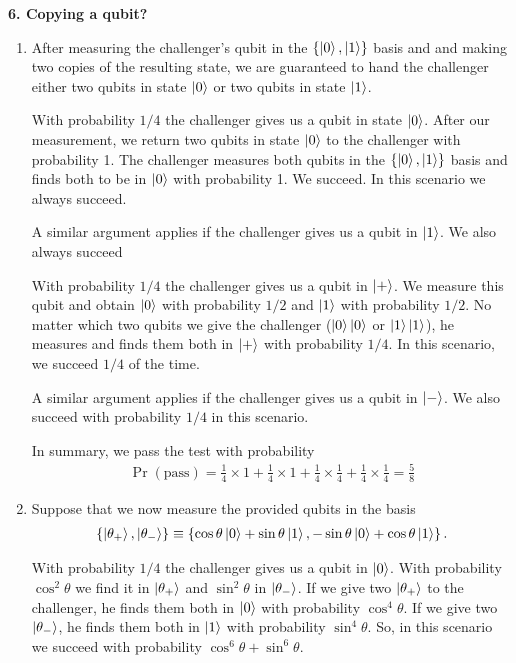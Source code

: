 \documentclass{article}
\theoremstyle{definition}
\newcommand{\f}[2]{\frac{#1}{#2}}
\newcommand{\lc}{\left\{}
\newcommand{\rc}{\right\}}
\begin{document}
\noindent \textbf{6. Copying a qubit?}

\begin{enumerate}[label=(\alph*)]
	\item After measuring the challenger's qubit in the $\{ \ket{0}, \ket{1} \}$ basis and and making two copies of the resulting state, we are guaranteed to hand the challenger either two qubits in state $\ket{0}$ or two qubits in state $\ket{1}$. 
	
	With probability $1/4$ the challenger gives us a qubit in state $\ket{0}$. After our measurement, we return two qubits in state $\ket{0}$ to the challenger with probability 1. The challenger measures both qubits in the $\{\ket{0}, \ket{1}\}$ basis and finds both to be in $\ket{0}$ with probability 1. We succeed. In this scenario we always succeed.
		
	A similar argument applies if the challenger gives us a qubit in $\ket{1}$. We also always succeed
	
	With probability $1/4$ the challenger gives us a qubit in $\ket{+}$. We measure this qubit and obtain $\ket{0}$ with probability $1/2$ and $\ket{1}$ with probability $1/2$. No matter which two qubits we give the challenger ($\ket{0}\ket{0}$ or $\ket{1}\ket{1}$), he measures and finds them both in $\ket{+}$ with probability $1/4$. In this scenario, we succeed $ 1/4 $ of the time.  
	
	A similar argument applies if the challenger gives us a qubit in $\ket{-}$. We also succeed with probability $1/4$ in this scenario. 
	
	In summary, we pass the test with probability
	\begin{align*}
		\Pr(\text{pass}) = \f{1}{4}\times 1 + \f{1}{4}\times 1 + \f{1}{4}\times \f{1}{4} + \f{1}{4}\times \f{1}{4} = \boxed{\f{5}{8}}
	\end{align*}
	
	\item Suppose that we now measure the provided qubits in the basis 
	\begin{align*}
		\lc \ket{\theta_+}, \ket{\theta_-} \rc \equiv \lc \cos\theta \ket{0} + \sin\theta \ket{1}, -\sin\theta\ket{0} + \cos\theta \ket{1} \rc.
	\end{align*}
	
	With probability $1/4$ the challenger gives us a qubit in $\ket{0}$. With probability $\cos^2\theta$ we find it in $\ket{\theta_+}$ and $\sin^2\theta$ in $\ket{\theta_-}$. If we give two $\ket{\theta_+}$ to the challenger, he finds them both in $\ket{0}$ with probability $\cos^4\theta$. If we give two $\ket{\theta_-}$, he finds them both in $\ket{1}$ with probability $\sin^4\theta$. So, in this scenario we succeed with probability $\cos^6\theta+\sin^6\theta$. 
	

\end{enumerate}
\end{document}

